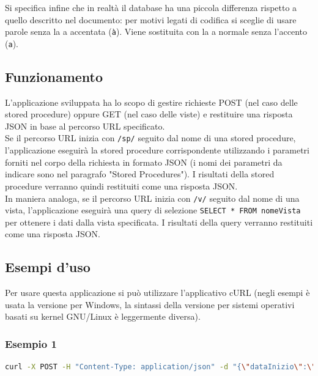 \documentclass[a4paper, 10pt, oneside]{article} %
\begin{document}
Si specifica infine che in realtà il database ha una piccola differenza rispetto a quello descritto nel documento: per motivi legati di codifica si sceglie di usare parole senza la a accentata (\texttt{à}). Viene sostituita con la a normale senza l'accento (\texttt{a}).

\subsection{Funzionamento}

L'applicazione sviluppata ha lo scopo di gestire richieste POST (nel caso delle stored procedure) oppure GET (nel caso delle viste) e restituire una risposta JSON in base al percorso URL specificato.\\

Se il percorso URL inizia con \texttt{/sp/} seguito dal nome di una stored procedure, l'applicazione eseguirà la stored procedure corrispondente utilizzando i parametri forniti nel corpo della richiesta in formato JSON (i nomi dei parametri da indicare sono nel paragrafo "Stored Procedures"). I risultati della stored procedure verranno quindi restituiti come una risposta JSON.\\

In maniera analoga, se il percorso URL inizia con \texttt{/v/} seguito dal nome di una vista, l'applicazione eseguirà una query di selezione \texttt{SELECT * FROM nomeVista} per ottenere i dati dalla vista specificata. I risultati della query verranno restituiti come una risposta JSON.

\subsection{Esempi d'uso}

Per usare questa applicazione si può utilizzare l'applicativo cURL (negli esempi è usata la versione per Windows, la sintassi della versione per sistemi operativi basati su kernel GNU/Linux è leggermente diversa).

\lstset{
basicstyle=\ttfamily,
breaklines=true,
columns=fullflexible,
frame=single,
showstringspaces=false
}

\subsubsection*{Esempio 1}
\begin{lstlisting}[language=bash]
curl -X POST -H "Content-Type: application/json" -d "{\"dataInizio\":\"2010-05-16\",\"dataFine\":\"2023-05-18\",\"aulaID\":2}" http://localhost:5000/sp/ElencoPrenotazioniAula
\end{lstlisting}
\end{document}
